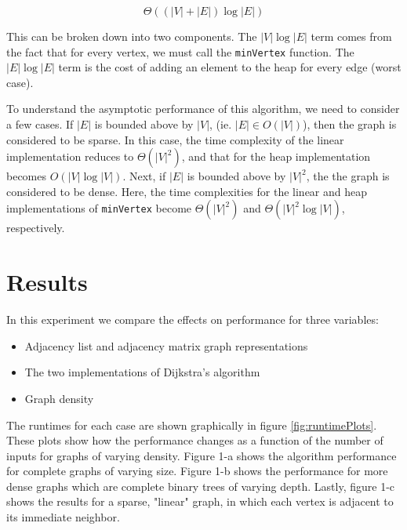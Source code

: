 \documentclass[technote]{IEEEtran}
\begin{document}
$$\Theta ( (|V| + |E|) \log|E| )$$


This can be broken down into two components. 
The $|V|\log|E|$ term comes from the fact that for every vertex, 
we must call the \texttt{minVertex} function.
The $|E|\log|E|$ term is the cost of adding an element to the 
heap for every edge (worst case).


To understand the asymptotic performance of this algorithm, 
we need to consider a few cases.
If $|E|$ is bounded above by $|V|$, (ie. $|E| \in O(|V|)$), 
then the graph is considered to be sparse. In this case,
the time complexity of the linear implementation reduces to 
$\Theta(|V|^2)$, and that for the heap implementation becomes $O(|V| \log |V|)$.
Next, if $|E|$ is bounded above by $|V|^2$, the the graph is considered to be dense.
Here, the time complexities for the linear and heap implementations of \texttt{minVertex}
become $\Theta(|V|^2)$ and $\Theta(|V|^2 \log|V|)$, respectively.



\newpage

\section{Results}
In this experiment we compare the effects on performance for
three variables: 
\begin{itemize}
    \item Adjacency list and adjacency matrix graph representations

    \item The two implementations of Dijkstra's  algorithm 

    \item Graph density
\end{itemize}


The runtimes for each case are shown graphically in figure \ref{fig:runtimePlots}.
These plots show how the performance changes as a function of the number of inputs 
for graphs of varying density. 
Figure 1-a shows the algorithm performance for complete graphs 
of varying size.
Figure 1-b shows the performance for more dense graphs which are 
complete binary trees of varying depth. Lastly, figure 1-c 
shows the results for a sparse, "linear" graph, in which 
each vertex is adjacent to its immediate neighbor.
\end{document}
